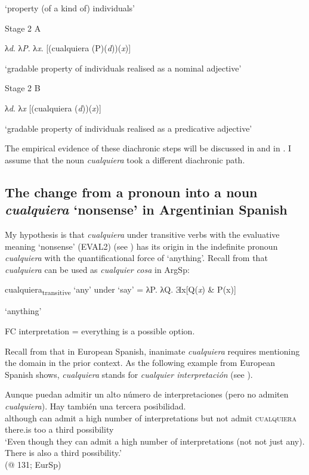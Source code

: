 ‘property (of a kind of) individuals’    

\ex Stage 2 A

    λ\textit{d}. λ\textit{P}. λ\textit{x}. [(cualquiera (P)(\textit{d}))(\textit{x})]

‘gradable property of individuals realised as a nominal adjective’  

\ex Stage 2 B

    λ\textit{d}. λ\textit{x} [(cualquiera (\textit{d}))(\textit{x})]

‘gradable property of individuals realised as a predicative adjective’     
\z
\z

The empirical evidence of these diachronic steps will be discussed in  and in .
I assume that the noun \textit{cualquiera} took a different diachronic path.

\subsection{{The} {change} {from} {a} {pronoun} {into} {a} {noun} {\textit{cualquiera}} {‘nonsense’} {in} {Argentinian Spanish}} \label{sec:4.5.2}

My hypothesis is that \textit{cualquiera} under transitive verbs with the evaluative meaning ‘nonsense’ (EVAL2) (see ) has its origin in the indefinite pronoun \textit{cualquiera} with the quantificational force of ‘anything’. Recall from  that \textit{cualquiera} can be used as \textit{cualquier cosa} in ArgSp:

\ea \label{ex:key:227} %
    cualquiera\textsubscript{transitive} ‘any’ under ‘say’ = λP. λQ. Ǝx[Q(\textit{x}) \& P(x)] 
    
    ‘anything’

FC interpretation = everything is a possible option.
\z

Recall from  that in European Spanish, inanimate \textit{cualquiera} requires mentioning the domain in the prior context. As the following example from European Spanish shows, \textit{cualquiera} stands for \textit{cualquier interpretación} (see ).

\ea \label{ex:key:228} %
   \gll Aunque puedan admitir un alto número de interpretaciones (pero no admiten \textit{cualquiera}). Hay también una tercera posibilidad.\\
    although can admit a high number of interpretations but not admit \textsc{cualquiera} there.is too a third possibility\\
    \glt ‘Even though they can admit a high number of interpretations (not not just any). There is also a third possibility.’\\
    (@ 131; EurSp)
\z

